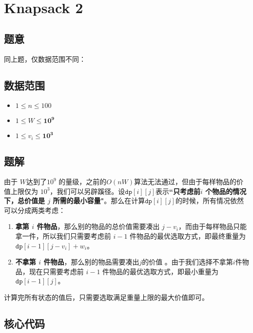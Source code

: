\section{Knapsack 2}
\subsection*{题意}
同上题，仅数据范围不同：
\subsection*{数据范围}
\begin{itemize}
\item $1 \leq n \leq 100$
\item $1 \leq W \leq \bm{10^9}$
\item $1 \leq v_i \leq \bm{10^3}$
\end{itemize}

\subsection*{题解}

由于 $W$达到了$10^9$ 的量级，之前的$O(nW)$算法无法通过，但由于每样物品的价值上限仅为 $10^3$，我们可以另辟蹊径。设${\texttt{dp}[i][j]}$表示\textbf{``只考虑前$i$ 个物品的情况下，总价值是 $j$ 所需的最小容量"}。那么在计算${\texttt{dp}[i][j]}$的时候，所有情况依然可以分成两类考虑：
\begin{enumerate}
    \item \textbf{拿第 $i$ 件物品}，那么别的物品的总价值需要凑出 $j - v_i$，而由于每样物品只能拿一件，所以我们只需要考虑前 $i-1$ 件物品的最优选取方式，即最终重量为 ${\texttt{dp}}[i-1][j-v_i] + w_i$。
    \item \textbf{不拿第 $i$ 件物品}，那么别的物品需要凑出$j$的价值 。由于我们选择不拿第$i$件物品，现在只需要考虑前 $i-1$ 件物品的最优选取方式，即最小重量为 ${\texttt{dp}}[i-1][j]$。
\end{enumerate}
计算完所有状态的值后，只需要选取满足重量上限的最大价值即可。
\subsection*{核心代码}
\inputminted[linenos,autogobble]{cpp}{./Code/E.cpp}
\newpage